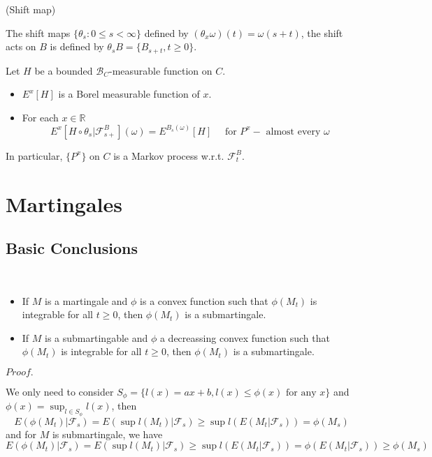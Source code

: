 \documentclass{article}
\newcommand{\Pf}[1]{$Proof.$\par}
\newcommand{\F}{\mathcal{F}}
\begin{document}
\begin{definition}(Shift map)\par
    The shift maps $\{\theta_s: 0 \leq s < \infty\}$ defined by $(\theta_x \omega)(t) = \omega(s+t)$, the shift acts on $B$ is defined by $\theta_sB = \{B_{s+t}, t\geq 0\}$.
\end{definition}

\begin{proposition}
    Let $H$ be a bounded $\mathcal{B}_C$-measurable function on $C$.\par
    \begin{itemize}
        \item $E^x[H]$ is a Borel measurable function of $x$.\par
        \item For each $x\in \mathbb{R}$
            \[E^x[H\circ \theta_s|\F_{s+}^B](\omega) = E^{B_s(\omega)}[H]\quad\text{ for }P^x-\text{ almost every }\omega\] 
    \end{itemize}
    In particular, $\{P^x\}$ on $C$ is a Markov process w.r.t. $\F_t^B$. 
\end{proposition}

\section{Martingales}

\subsection{Basic Conclusions}

\begin{proposition}\ \par
    \begin{itemize}
        \item If $M$ is a martingale and $\phi$ is a convex function such that $\phi(M_t)$ is integrable for all $t\geq 0$, then $\phi(M_t)$ is a submartingale.
        \item If $M$ is a submartingable and $\phi$ a decreassing convex function such that $\phi(M_t)$ is integrable for all $t\geq 0$, then $\phi(M_t)$ is a submartingale.
    \end{itemize}
\end{proposition}
\Pf\par
We only need to consider $S_{\phi} = \{l(x) = ax+b, l(x) \leq \phi(x)\text{ for any }x\}$ and $\phi(x) = \sup_{l \in S_{\phi}} l(x)$, then
\[E(\phi(M_t)|\F_s) = E(\sup l(M_t)|\F_s) \geq \sup l(E(M_t|\F_s)) = \phi(M_s)\]
and for $M$ is submartingale, we have
\[E(\phi(M_t)|\F_s) = E(\sup l(M_t)|\F_s) \geq \sup l(E(M_t|\F_s)) = \phi(E(M_t|\F_s)) \geq \phi(M_s)\]
\end{document}
